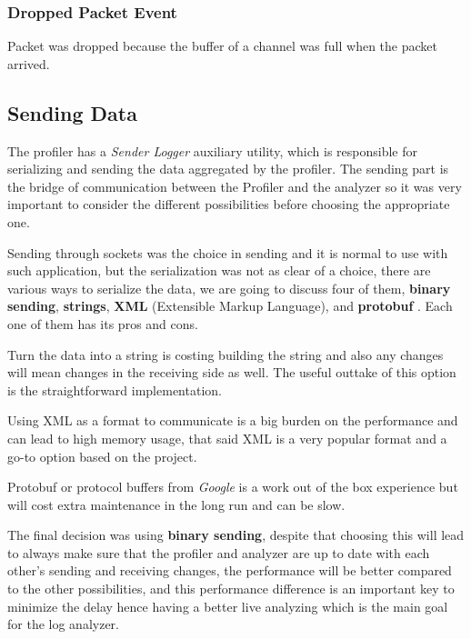 \subsubsection{Dropped Packet Event}
Packet was dropped because the buffer of a channel was full when the packet arrived.

\subsection{Sending Data} \label{sec:sending_data}
The profiler has a \textit{Sender Logger} auxiliary utility, which is responsible for serializing and sending
the data aggregated by the profiler. The sending part is the bridge of communication between the Profiler
and the analyzer so it was very important to consider the different possibilities before choosing the appropriate one.

Sending through sockets was the choice in sending and it is normal to use with such application, but the serialization
was not as clear of a choice, there are various ways to serialize the data, we are going to discuss four of them,
\textbf{binary sending}, \textbf{strings}, \textbf{XML} (Extensible Markup Language), and \textbf{protobuf} \cite{protobuf}.
Each one of them has its pros and cons.

Turn the data into a string is costing building the string and also any changes will mean changes in the
receiving side as well. The useful outtake of this option is the straightforward implementation.

Using XML as a format to communicate is a big burden on the performance and can lead to high memory usage,
that said XML is a very popular format and a go-to option based on the project.

Protobuf or protocol buffers from \textit{Google} is a work out of the box experience but will cost
extra maintenance in the long run and can be slow.

The final decision was using \textbf{binary sending}, despite that choosing this will lead to always make
sure that the profiler and analyzer are up to date with each other's sending and receiving
changes, the performance will be better compared to the other possibilities, and this performance
difference is an important key to minimize the delay hence having a better live analyzing which is the
main goal for the log analyzer.

